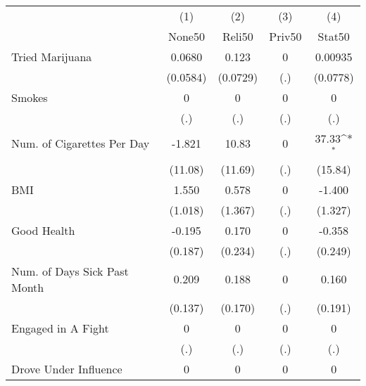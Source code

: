 {
\def\sym#1{\ifmmode^{#1}\else\(^{#1}\)\fi}
\begin{tabular}{l*{4}{c}}
\hline\hline
            &\multicolumn{1}{c}{(1)}&\multicolumn{1}{c}{(2)}&\multicolumn{1}{c}{(3)}&\multicolumn{1}{c}{(4)}\\
            &\multicolumn{1}{c}{None50}&\multicolumn{1}{c}{Reli50}&\multicolumn{1}{c}{Priv50}&\multicolumn{1}{c}{Stat50}\\
\hline
Tried Marijuana&      0.0680         &       0.123         &           0         &     0.00935         \\
            &    (0.0584)         &    (0.0729)         &         (.)         &    (0.0778)         \\
[1em]
Smokes      &           0         &           0         &           0         &           0         \\
            &         (.)         &         (.)         &         (.)         &         (.)         \\
[1em]
Num. of Cigarettes Per Day&      -1.821         &       10.83         &           0         &       37.33\sym{*}  \\
            &     (11.08)         &     (11.69)         &         (.)         &     (15.84)         \\
[1em]
BMI         &       1.550         &       0.578         &           0         &      -1.400         \\
            &     (1.018)         &     (1.367)         &         (.)         &     (1.327)         \\
[1em]
Good Health &      -0.195         &       0.170         &           0         &      -0.358         \\
            &     (0.187)         &     (0.234)         &         (.)         &     (0.249)         \\
[1em]
Num. of Days Sick Past Month&       0.209         &       0.188         &           0         &       0.160         \\
            &     (0.137)         &     (0.170)         &         (.)         &     (0.191)         \\
[1em]
Engaged in A Fight&           0         &           0         &           0         &           0         \\
            &         (.)         &         (.)         &         (.)         &         (.)         \\
[1em]
Drove Under Influence&           0         &           0         &           0         &           0         \\

\end{tabular}}
